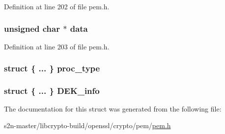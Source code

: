Definition at line 202 of file pem.\+h.

\subsubsection[{\texorpdfstring{data}{data}}]{\setlength{\rightskip}{0pt plus 5cm}unsigned char $\ast$ data}\hypertarget{structpem__ctx__st_a6f0f3eff16962881999799f7b0f66a0a}{}\label{structpem__ctx__st_a6f0f3eff16962881999799f7b0f66a0a}


Definition at line 203 of file pem.\+h.

\subsubsection[{\texorpdfstring{proc\+\_\+type}{proc_type}}]{\setlength{\rightskip}{0pt plus 5cm}struct \{ ... \}   proc\+\_\+type}\hypertarget{structpem__ctx__st_a6359320c297836646963ca5c7eb96ce5}{}\label{structpem__ctx__st_a6359320c297836646963ca5c7eb96ce5}
\subsubsection[{\texorpdfstring{D\+E\+K\+\_\+info}{DEK_info}}]{\setlength{\rightskip}{0pt plus 5cm}struct \{ ... \}   D\+E\+K\+\_\+info}\hypertarget{structpem__ctx__st_a5b0b27ec4814b105a6d9a08f4a248e9b}{}\label{structpem__ctx__st_a5b0b27ec4814b105a6d9a08f4a248e9b}


The documentation for this struct was generated from the following file\+:\begin{DoxyCompactItemize}
\item 
s2n-\/master/libcrypto-\/build/openssl/crypto/pem/\hyperlink{crypto_2pem_2pem_8h}{pem.\+h}\end{DoxyCompactItemize}
